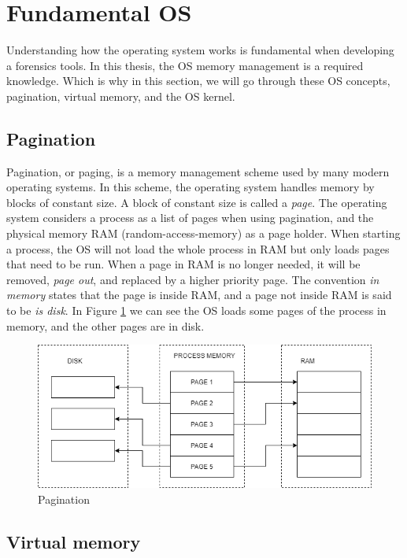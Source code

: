 \section[Fundamental OS]{Fundamental OS}

Understanding how the operating system works is fundamental when developing a
forensics tools. In this thesis, the OS memory management is a required
knowledge. Which is why in this section, we will go through these OS concepts,
pagination, virtual memory, and the OS kernel.

\subsection[Pagination]{Pagination}

Pagination, or paging, is a memory management scheme used by many modern
operating systems. In this scheme, the operating system handles memory by
blocks of constant size. A block of constant size is called a \textit{page}.
The operating system considers a process as a list of pages when using pagination,
and the physical memory RAM (random-access-memory) as a page holder. When
starting a process, the OS will not load the whole process in RAM but only
loads pages that need to be run. When a page in RAM is no longer needed, it
will be removed, \textit{page out}, and replaced by a higher priority page.
The convention \textit{in memory} states that the page is inside RAM, and a
page not inside RAM is said to be \textit{is disk}. In Figure
\ref{fig:pagination} we can see the OS loads some pages of the process in
memory, and the other pages are in disk.

\begin{figure}[h]
  \centering
  \caption{Pagination}
  \label{fig:pagination}
  \includegraphics[scale=0.7]{images/pagination.png}
\end{figure}

\subsection[Virtual memory]{Virtual memory}

